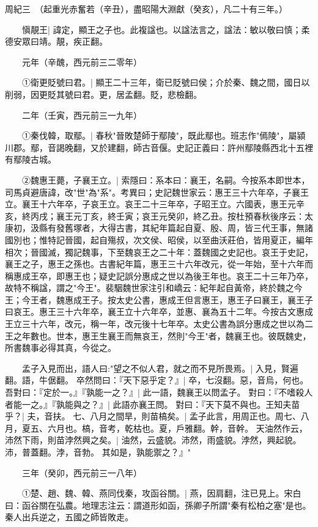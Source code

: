 周紀三　（起重光赤奮若（辛丑），盡昭陽大淵獻（癸亥），凡二十有三年。）

　　愼靚王|{
	諱定，顯王之子也。此複諡也。以諡法言之，諡法：敏以敬曰慎；柔德安眾曰靖。靚，疾正翻。
	}

　　元年（辛醜，西元前三二零年）

　　①衛更貶號曰君。|{
	顯王二十三年，衛已貶號曰侯；介於秦、魏之間，國日以削弱，因更貶其號曰君。更，居孟翻。貶，悲檢翻。
	}

　　二年（壬寅，西元前三一九年）

　　①秦伐韓，取鄢。|{
	春秋"晉敗楚師于鄢陵"，既此鄢也。班志作"傿陵"，屬潁川郡。鄢，音謁晚翻，又於建翻，師古音偃。史記正義曰：許州鄢陵縣西北十五裡有鄢陵古城。
	}

　　②魏惠王薨，子襄王立。|{
	索隱曰：系本曰：襄王，名嗣。今按系本即世本，司馬貞避唐諱，改"世"為"系"。考異曰；史記魏世家云：惠王三十六年卒，子襄王立。襄王十六年卒，子哀王立。哀王二十三年卒，子昭王立。六國表，惠王元辛亥，終丙戌；襄王元丁亥，終壬寅；哀王元癸卯，終乙丑。按杜預春秋後序云：太康初，汲縣有發舊塚者，大得古書，其紀年篇起自夏、殷、周，皆三代王事，無諸國別也；惟特記晉國，起自殤叔，次文侯、昭侯，以至曲沃莊伯，皆用夏正，編年相次；晉國滅，獨記魏事，下至魏哀王之二十年：蓋魏國之史記也。哀王于史記，襄王之子，惠王之孫也。古書紀年篇，惠王三十六年改元，從一年始，至十六年而稱惠成王卒，即惠王也；疑史記誤分惠成之世以為後王年也。哀王二十三年乃卒，故特不稱諡，謂之"今王"。裴駰魏世家注引和嶠云：紀年起自黃帝，終於魏之今王；今王者，魏惠成王子。按太史公書，惠成王但言惠王，惠王子曰襄王，襄王子曰哀王。惠王三十六年卒，襄王立十六年卒，並惠、襄為五十二年。今按古文惠成王立三十六年，改元，稱一年，改元後十七年卒。太史公書為誤分惠成之世以為二王之年數也。世本，惠王生襄王而無哀王，然則"今王"者，魏襄王也。彼既魏史，所書魏事必得其真，今從之。
	}

　　孟子入見而出，語人曰:"望之不似人君，就之而不見所畏焉。|{
	入見，賢遍翻。語，牛倨翻。
	}
卒然問曰：『天下惡乎定？』|{
	卒，七沒翻。惡，音烏，何也。
	}
吾對曰：『定於一。』『孰能一之？』|{
	此一語，魏襄王以問孟子。
	}
對曰：『不嗜殺人者能一之。』『孰能與之？』|{
	此語亦襄王問。
	}
對曰：『天下莫不與也。王知夫苗乎？|{
	夫，音扶。
	}
七、八月之間旱，則苗槁矣。|{
	孟子此言，用周正也。周七、八月，夏五、六月也。槁，音考，乾枯也。夏，戶雅翻。幹，音幹。
	}
天油然作云，沛然下雨，則苗浡然興之矣。|{
	油然，云盛貌。沛然，雨盛貌。浡然，興起貌。沛，普蓋翻。浡，音勃。
	}
其如是，孰能禦之？』"

　　三年（癸卯，西元前三一八年）

　　①楚、趙、魏、韓、燕同伐秦，攻函谷關。|{
	燕，因肩翻，注已見上。宋白曰：函谷關在弘農。地理志注云：謂道形如函，孫卿子所謂"秦有松柏之塞"是也。
	}
秦人出兵逆之，五國之師皆敗走。


